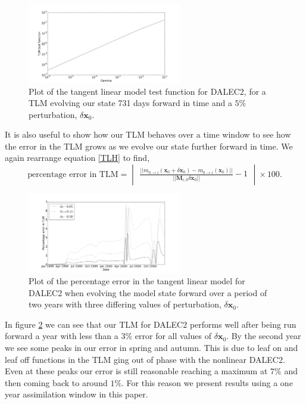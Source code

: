 \documentclass[11pt]{article}
\begin{document}
\begin{figure}[ht]
    \centering
    \includegraphics[width=0.6\textwidth]{testtlmer.png}
    \caption{Plot of the tangent linear model test function for DALEC2, for a TLM evolving our state 731 days forward in time and a $5\%$ perturbation, $\delta \textbf{x}_0$.}
    \label{fig:tlm}
\end{figure}

It is also useful to show how our TLM behaves over a time window to see how the error in the TLM grows as we evolve our state further forward in time. We again rearrange equation \ref{TLH} to find, 
\begin{equation}
\text{percentage error in TLM} = \begin{vmatrix} \frac{||m_{0\rightarrow i}(\mathbf{x}_0+\delta\mathbf{x}_0) - m_{0 \rightarrow i}(\mathbf{x}_0)||}{|| \mathbf{M}_{i,0}\delta\mathbf{x}_0||} - 1 \end{vmatrix} \times 100.
\end{equation}

\begin{figure}[ht]
    \centering
    \includegraphics[width=0.6\textwidth]{tlm_error.png}
    \caption{Plot of the percentage error in the tangent linear model for DALEC2 when evolving the model state forward over a period of two years with three differing values of perturbation, $\delta \textbf{x}_0$.}
    \label{fig:tlm_error}
\end{figure}

In figure \ref{fig:tlm_error} we can see that our TLM for DALEC2 performs well after being run forward a year with less than a $3\%$ error for all values of $\delta \textbf{x}_0$. By the second year we see some peaks in our error in spring and autumn. This is due to leaf on and leaf off functions in the TLM ging out of phase with the nonlinear DALEC2. Even at these peaks our error is still reasonable reaching a maximum at $7\%$ and then coming back to around $1\%$. For this reason we present results using a one year assimilation window in this paper. 
\end{document}
